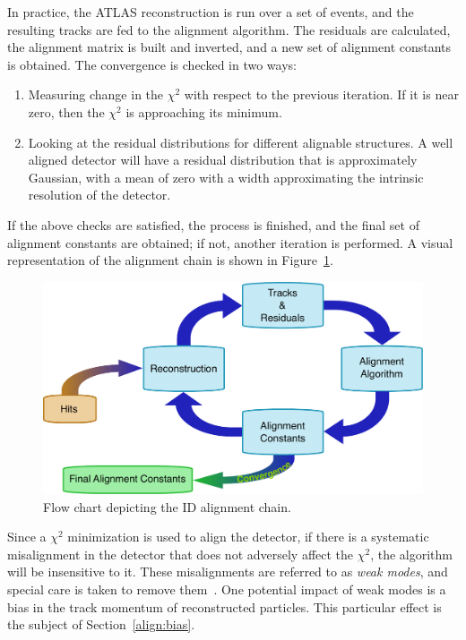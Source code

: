 In practice, the ATLAS reconstruction is run over a set of events, and the resulting tracks are fed to the alignment algorithm.
The residuals are calculated, the alignment matrix is built and inverted, and a new set of alignment constants is obtained.
The convergence is checked in two ways:
\begin{enumerate}
\item Measuring change in the $\chi^2$ with respect to the previous iteration. If it is near zero, then the $\chi^2$ is approaching its minimum.
\item Looking at the residual distributions for different alignable structures. A well aligned detector will have a residual distribution that is approximately Gaussian, with a mean of zero with a width approximating the intrinsic resolution of the detector.
\end{enumerate}
If the above checks are satisfied, the process is finished, and the final set of alignment constants are obtained; if not, another iteration is performed.
A visual representation of the alignment chain is shown in Figure~\ref{fig:alignment_chain}.

\begin{figure}[htbp]
  \centering
  \includegraphics[width=.8\textwidth]{figs/alignment/alignment-chain}
  \caption{Flow chart depicting the ID alignment chain.}
  \label{fig:alignment_chain}
\end{figure}

Since a $\chi^2$ minimization is used to align the detector, if there is a systematic misalignment in the detector that does not adversely affect the $\chi^2$, the algorithm will be insensitive to it.
These misalignments are referred to as \emph{weak modes}, and special care is taken to remove them~\cite{2014.alignment-performance-8tev}.
One potential impact of weak modes is a bias in the track momentum of reconstructed particles.
This particular effect is the subject of Section~\ref{align:bias}.

